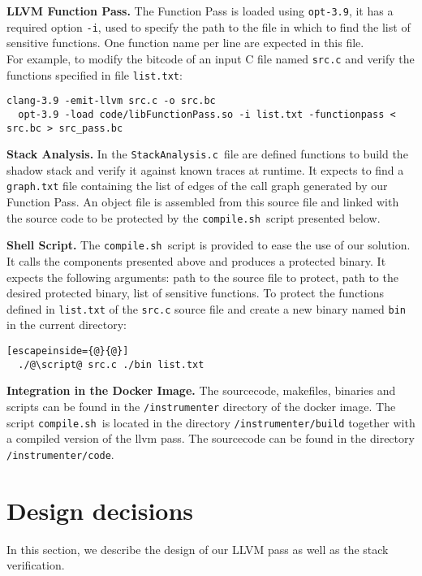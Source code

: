 \documentclass{llncs}
\newcommand{\stacka}{\texttt{StackAnalysis.c }}
\newcommand{\script}{\texttt{compile.sh }}
\begin{document}
\noindent\textbf{LLVM Function Pass.}\newline
The Function Pass is loaded using \texttt{opt-3.9}, it has a required option \texttt{-i}, used to specify the path to the file in which to find the list of sensitive functions. One function name per line are expected in this file.\\
For example, to modify the bitcode of an input C file named \texttt{src.c} and verify the functions specified in file \texttt{list.txt}:
\begin{lstlisting}[basicstyle=\scriptsize]
  clang-3.9 -emit-llvm src.c -o src.bc
  opt-3.9 -load code/libFunctionPass.so -i list.txt -functionpass < src.bc > src_pass.bc
\end{lstlisting}

\noindent\textbf{Stack Analysis.}\newline
In the \stacka file are defined functions to build the shadow stack and verify it against known traces at runtime. It expects to find a \texttt{graph.txt} file containing the list of edges of the call graph generated by our Function Pass. An object file is assembled from this source file and linked with the source code to be protected by the \script script presented below.\newline

\noindent\textbf{Shell Script.}\newline
The \script script is provided to ease the use of our solution. It calls the components presented above and produces a protected binary. It expects the following arguments: path to the source file to protect, path to the desired protected binary, list of sensitive functions. To protect the functions defined in \texttt{list.txt} of the \texttt{src.c} source file and create a new binary named \texttt{bin} in the current directory:
\begin{lstlisting}[escapeinside={@}{@}]
  ./@\script@ src.c ./bin list.txt
\end{lstlisting}

\noindent\textbf{Integration in the Docker Image.}\newline
The sourcecode, makefiles, binaries and scripts can be found in the \texttt{/instrumenter} directory of the docker image. The script \script is located in the directory \texttt{/instrumenter/build} together with a compiled version of the llvm pass. The sourcecode can be found in the directory \texttt{/instrumenter/code}.
\newpage

\section{Design decisions}
In this section, we describe the design of our LLVM pass as well as the stack verification.
\end{document}
